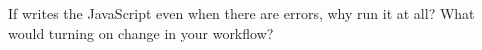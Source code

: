 \begin{ponder}If  writes the JavaScript even when there are errors, why run it at all? What would turning on  change in your workflow?\end{ponder}
